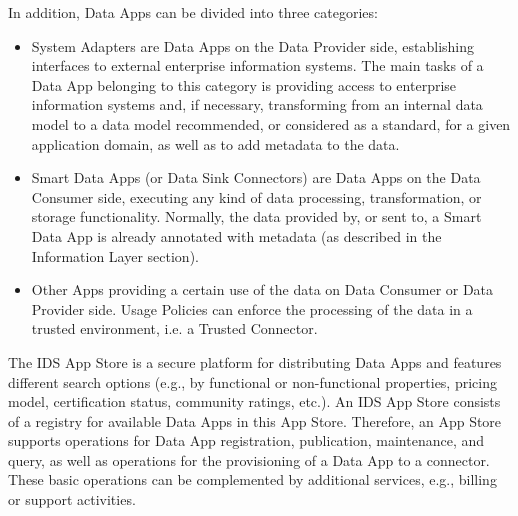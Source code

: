 In addition, Data Apps can be divided into three categories:

\begin{itemize}
	\item System Adapters are Data Apps on the Data Provider side, establishing interfaces to external enterprise information systems. The main tasks of a Data App belonging to this category is providing access to enterprise information systems and, if necessary, transforming from an internal data model to a data model recommended, or considered as a standard, for a given application domain, as well as to add metadata to the data.

	\item Smart Data Apps (or Data Sink Connectors) are Data Apps on the Data Consumer side, executing any kind of data processing, transformation, or storage functionality. Normally, the data provided by, or sent to, a Smart Data App is already annotated with metadata (as described in the Information Layer section).

	\item Other Apps providing a certain use of the data on Data Consumer or Data Provider side. Usage Policies can enforce the processing of the data in a trusted environment, i.e. a Trusted Connector. 
\end{itemize}



The IDS App Store is a secure platform for distributing Data Apps and features different search options (e.g., by functional or non-functional properties, pricing model, certification status, community ratings, etc.). An IDS App Store consists of a registry for available Data Apps in this App Store. Therefore, an App Store supports operations for Data App registration, publication, maintenance, and query, as well as operations for the provisioning of a Data App to a connector. These basic operations can be complemented by additional services, e.g., billing or support activities. 


